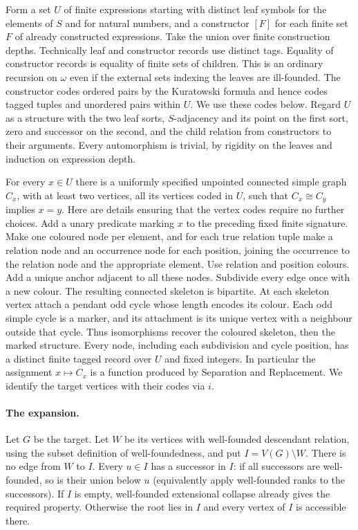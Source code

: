 \documentclass[11pt]{article}
\begin{document}
Form a set $U$ of finite expressions starting with distinct leaf symbols for the elements of $S$ and for natural numbers, and a constructor $[F]$ for each finite set $F$ of already constructed expressions. Take the union over finite construction depths. Technically leaf and constructor records use distinct tags. Equality of constructor records is equality of finite sets of children. This is an ordinary recursion on $\omega$ even if the external sets indexing the leaves are ill-founded. The constructor codes ordered pairs by the Kuratowski formula and hence codes tagged tuples and unordered pairs within $U$. We use these codes below. Regard $U$ as a structure with the two leaf sorts, $S$-adjacency and its point on the first sort, zero and successor on the second, and the child relation from constructors to their arguments. Every automorphism is trivial, by rigidity on the leaves and induction on expression depth.

For every $x\in U$ there is a uniformly specified unpointed connected simple graph $C_x$, with at least two vertices, all its vertices coded in $U$, such that $C_x\cong C_y$ implies $x=y$. Here are details ensuring that the vertex codes require no further choices. Add a unary predicate marking $x$ to the preceding fixed finite signature. Make one coloured node per element, and for each true relation tuple make a relation node and an occurrence node for each position, joining the occurrence to the relation node and the appropriate element. Use relation and position colours. Add a unique anchor adjacent to all these nodes. Subdivide every edge once with a new colour. The resulting connected skeleton is bipartite. At each skeleton vertex attach a pendant odd cycle whose length encodes its colour. Each odd simple cycle is a marker, and its attachment is its unique vertex with a neighbour outside that cycle. Thus isomorphisms recover the coloured skeleton, then the marked structure. Every node, including each subdivision and cycle position, has a distinct finite tagged record over $U$ and fixed integers. In particular the assignment $x\mapsto C_x$ is a function produced by Separation and Replacement. We identify the target vertices with their codes via $i$.

\paragraph{The expansion.} Let $G$ be the target. Let $W$ be its vertices with well-founded descendant relation, using the subset definition of well-foundedness, and put $I=V(G)\setminus W$. There is no edge from $W$ to $I$. Every $u\in I$ has a successor in $I$: if all successors are well-founded, so is their union below $u$ (equivalently apply well-founded ranks to the successors). If $I$ is empty, well-founded extensional collapse already gives the required property. Otherwise the root lies in $I$ and every vertex of $I$ is accessible there.
\end{document}
